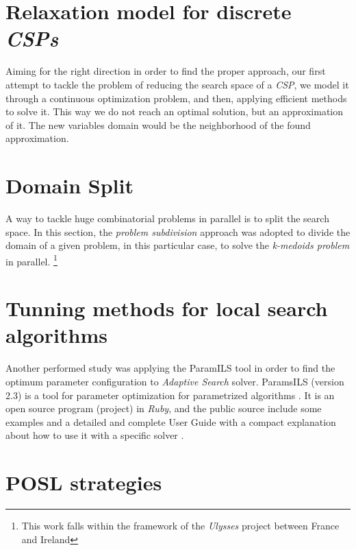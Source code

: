 \documentclass[a4paper]{book} %
\newcommand{\posl}{{\sc POSL}}
\newcommand{\csp}{\textit{CSP}}
\newcommand{\csps}{\csp\textit{s}}
\begin{document}
\begin{appendices}
\noappendicestocpagenum
\addappheadtotoc

\chapter{Relaxation model for discrete \csps}
\label{app:relaxation}

Aiming for the right direction in order to find the proper approach, our first attempt to tackle the problem of reducing the search space of a \csp, we model it through a continuous optimization problem, and then, applying efficient methods to solve it. This way we do not reach an optimal solution, but an approximation of it. The new variables domain would be the neighborhood of the found approximation.

\chapter{Domain Split}
\label{app:split}

A way to tackle huge combinatorial problems in parallel is to split the search space. In this section, the {\it problem subdivision} approach was adopted to divide the domain of a given problem, in this particular case, to solve the {\it k-medoids problem} in parallel. \footnote{This work falls within the framework of the \textit{Ulysses} project between France and Ireland}

\chapter{Tunning methods for local search algorithms}
\label{app:tunning}

Another performed study was applying the {\sc ParamILS} tool in order to find the optimum parameter configuration to {\it Adaptive Search} solver. {\sc ParamsILS} (version 2.3) is a tool for parameter optimization for parametrized algorithms \cite{Hutter2009}. 
It is an open source program (project) in {\it Ruby}, and the public source include some examples and a detailed and complete User Guide with a compact explanation about how to use it with a specific solver \cite{Hutter2008}.

\chapter{\posl{} strategies}


\end{appendices}
\end{document}

